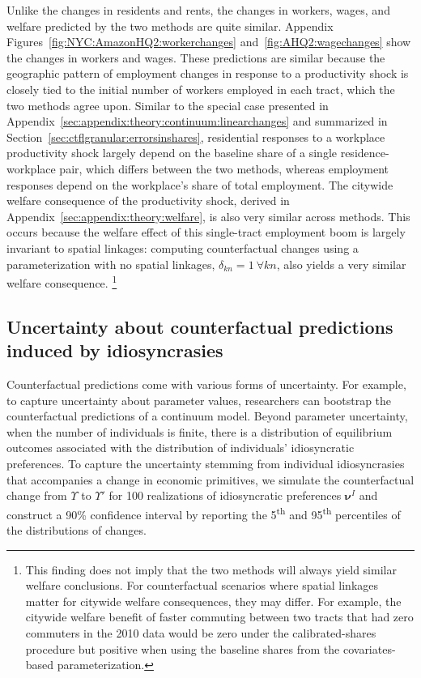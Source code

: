 \documentclass[11pt]{article}
\theoremstyle{definition}
\newcommand\idiosyncraticphrase{idiosyncratic preference}
\begin{document}
Unlike the changes in residents and rents,
the changes in workers, wages, and welfare predicted by the two methods are quite similar.
Appendix Figures~\ref{fig:NYC:AmazonHQ2:workerchanges} and~\ref{fig:AHQ2:wagechanges} show the changes in workers and wages.
These predictions are similar because the geographic pattern of employment changes in response to a productivity shock
is closely tied to the initial number of workers employed in each tract,
which the two methods agree upon.
Similar to the special case presented in Appendix~\ref{sec:appendix:theory:continuum:linearchanges} and summarized in Section~\ref{sec:ctflgranular:errorsinshares},
residential responses to a workplace productivity shock
largely depend on the baseline share of a single residence-workplace pair, which differs between the two methods,
whereas employment responses depend on the workplace's share of total employment.
The citywide welfare consequence of the productivity shock,
derived in Appendix~\ref{sec:appendix:theory:welfare},
is also very similar across methods.
This occurs because the welfare effect of this single-tract employment boom is largely invariant to spatial linkages:
computing counterfactual changes using a parameterization with no spatial linkages, $\delta_{kn} = 1 \ \forall kn$, also yields a very similar welfare consequence.%
\footnote{
	This finding does not imply that the two methods will always yield similar welfare conclusions.
	For counterfactual scenarios where spatial linkages matter for citywide welfare consequences,
	they may differ.
	For example, the citywide welfare benefit of faster commuting between two tracts that had zero commuters in the 2010 data would be zero under the calibrated-shares procedure but positive when using the baseline shares from the covariates-based parameterization.
}

\subsection{Uncertainty about counterfactual predictions induced by idiosyncrasies}\label{sec:AmazonHQ2:secondmoments}

Counterfactual predictions come with various forms of uncertainty.
For example, to capture uncertainty about parameter values,
researchers can bootstrap the counterfactual predictions of a continuum model.
Beyond parameter uncertainty, when the number of individuals is finite,
there is a distribution of equilibrium outcomes associated with the distribution of individuals' \idiosyncraticphrase s.
To capture the uncertainty stemming from individual idiosyncrasies that accompanies a change in economic primitives,
we simulate the counterfactual change from $\Upsilon$ to $\Upsilon'$ 
for 100 realizations of \idiosyncraticphrase s $\boldsymbol \nu^{I}$
and
construct a 90\% confidence interval by reporting the 5\textsuperscript{th} and 95\textsuperscript{th} percentiles of the distributions of changes. 
\end{document}
